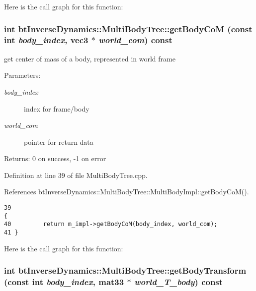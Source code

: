 Here is the call graph for this function:\hypertarget{classbt_inverse_dynamics_1_1_multi_body_tree_86d4152e8487c354a725e71e92851002}{
\subsubsection[getBodyCoM]{\setlength{\rightskip}{0pt plus 5cm}int btInverseDynamics::MultiBodyTree::getBodyCoM (const int {\em body\_\-index}, \/  {\bf vec3} $\ast$ {\em world\_\-com}) const}}
\label{classbt_inverse_dynamics_1_1_multi_body_tree_86d4152e8487c354a725e71e92851002}


get center of mass of a body, represented in world frame \begin{Desc}
\item[Parameters:]
\begin{description}
\item[{\em body\_\-index}]index for frame/body \item[{\em world\_\-com}]pointer for return data \end{description}
\end{Desc}
\begin{Desc}
\item[Returns:]0 on success, -1 on error \end{Desc}


Definition at line 39 of file MultiBodyTree.cpp.

References btInverseDynamics::MultiBodyTree::MultiBodyImpl::getBodyCoM().

\begin{Code}\begin{verbatim}39                                                                          {
40         return m_impl->getBodyCoM(body_index, world_com);
41 }
\end{verbatim}
\end{Code}




Here is the call graph for this function:\hypertarget{classbt_inverse_dynamics_1_1_multi_body_tree_582514119940a8dcc10d06cd97019143}{
\subsubsection[getBodyTransform]{\setlength{\rightskip}{0pt plus 5cm}int btInverseDynamics::MultiBodyTree::getBodyTransform (const int {\em body\_\-index}, \/  mat33 $\ast$ {\em world\_\-T\_\-body}) const}}
\label{classbt_inverse_dynamics_1_1_multi_body_tree_582514119940a8dcc10d06cd97019143}


